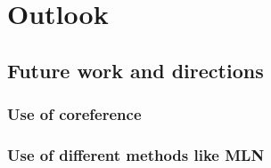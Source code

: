 \chapter{Outlook}\label{chapter:outlook}

\section{Future work and directions}

\subsection{Use of coreference}

\subsection{Use of different methods like MLN}
